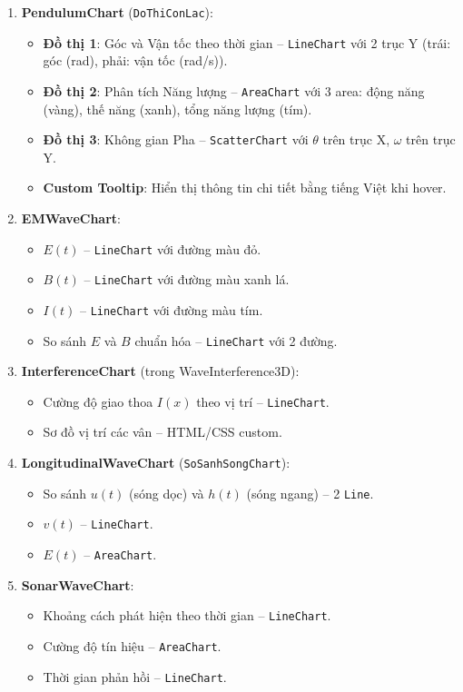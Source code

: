\begin{enumerate}
    \item \textbf{PendulumChart} (\texttt{DoThiConLac}):
    \begin{itemize}
        \item \textbf{Đồ thị 1}: Góc và Vận tốc theo thời gian – \texttt{LineChart} với 2 trục Y (trái: góc (rad), phải: vận tốc (rad/s)).
        \item \textbf{Đồ thị 2}: Phân tích Năng lượng – \texttt{AreaChart} với 3 area: động năng (vàng), thế năng (xanh), tổng năng lượng (tím).
        \item \textbf{Đồ thị 3}: Không gian Pha – \texttt{ScatterChart} với $\theta$ trên trục X, $\omega$ trên trục Y.
        \item \textbf{Custom Tooltip}: Hiển thị thông tin chi tiết bằng tiếng Việt khi hover.
    \end{itemize}
    
    \item \textbf{EMWaveChart}:
    \begin{itemize}
        \item $E(t)$ – \texttt{LineChart} với đường màu đỏ.
        \item $B(t)$ – \texttt{LineChart} với đường màu xanh lá.
        \item $I(t)$ – \texttt{LineChart} với đường màu tím.
        \item So sánh $E$ và $B$ chuẩn hóa – \texttt{LineChart} với 2 đường.
    \end{itemize}
    
    \item \textbf{InterferenceChart} (trong WaveInterference3D):
    \begin{itemize}
        \item Cường độ giao thoa $I(x)$ theo vị trí – \texttt{LineChart}.
        \item Sơ đồ vị trí các vân – HTML/CSS custom.
    \end{itemize}
    
    \item \textbf{LongitudinalWaveChart} (\texttt{SoSanhSongChart}):
    \begin{itemize}
        \item So sánh $u(t)$ (sóng dọc) và $h(t)$ (sóng ngang) – 2 \texttt{Line}.
        \item $v(t)$ – \texttt{LineChart}.
        \item $E(t)$ – \texttt{AreaChart}.
    \end{itemize}
    
    \item \textbf{SonarWaveChart}:
    \begin{itemize}
        \item Khoảng cách phát hiện theo thời gian – \texttt{LineChart}.
        \item Cường độ tín hiệu – \texttt{AreaChart}.
        \item Thời gian phản hồi – \texttt{LineChart}.
    \end{itemize}
\end{enumerate}

